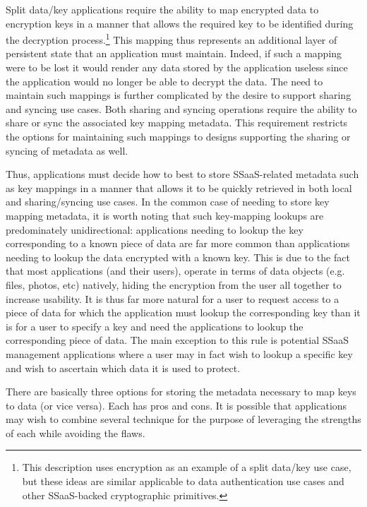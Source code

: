 Split data/key applications require the ability to map encrypted data
to encryption keys in a manner that allows the required key to be
identified during the decryption process.\footnote{This description
  uses encryption as an example of a split data/key use case, but
  these ideas are similar applicable to data authentication use cases
  and other SSaaS-backed cryptographic primitives.} This mapping thus
represents an additional layer of persistent state that an application
must maintain. Indeed, if such a mapping were to be lost it would
render any data stored by the application useless since the
application would no longer be able to decrypt the data. The need to
maintain such mappings is further complicated by the desire to support
sharing and syncing use cases. Both sharing and syncing operations
require the ability to share or sync the associated key mapping
metadata. This requirement restricts the options for maintaining such
mappings to designs supporting the sharing or syncing of metadata as
well.

Thus, applications must decide how to best to store SSaaS-related
metadata such as key mappings in a manner that allows it to be quickly
retrieved in both local and sharing/syncing use cases. In the common
case of needing to store key mapping metadata, it is worth noting that
such key-mapping lookups are predominately unidirectional:
applications needing to lookup the key corresponding to a known piece
of data are far more common than applications needing to lookup the
data encrypted with a known key. This is due to the fact that most
applications (and their users), operate in terms of data objects
(e.g. files, photos, etc) natively, hiding the encryption from the
user all together to increase usability. It is thus far more natural
for a user to request access to a piece of data for which the
application must lookup the corresponding key than it is for a user to
specify a key and need the applications to lookup the corresponding
piece of data. The main exception to this rule is potential SSaaS
management applications where a user may in fact wish to lookup a
specific key and wish to ascertain which data it is used to protect.

There are basically three options for storing the metadata necessary
to map keys to data (or vice versa). Each has pros and cons. It is
possible that applications may wish to combine several technique for
the purpose of leveraging the strengths of each while avoiding the
flaws.

